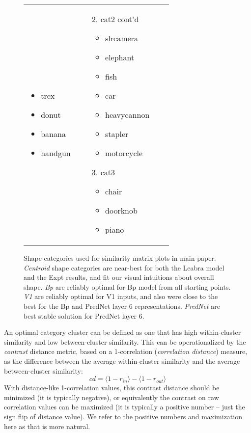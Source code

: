 \documentclass[12pt,twoside]{naturefigs}
\newif\myifpdf
\begin{document}
\begin{figure}
\begin{tabular}{llll}
{\begin{enumerate}
\begin{itemize}[leftmargin=*]
	\item trex
	\item donut
	\item banana
	\item handgun
	\end{itemize}
	\end{enumerate}
	} & 
	 \parbox[t]{1.4in}{\raggedright 	{} \small
	\begin{enumerate}
	\item[2.] cat2 cont'd
	\begin{itemize}[leftmargin=*]
	\item slrcamera
	\item elephant
	\item fish
	\item car
	\item heavycannon
	\item stapler
	\item motorcycle
	\end{itemize}
	\item[3.] cat3
	\begin{itemize}[leftmargin=*]
	\item chair
	\item doorknob
	\item piano
	\end{itemize}
	\end{enumerate}
	}\\
	\end{tabular}
	\caption{Shape categories used for similarity matrix plots in main paper.  {\em Centroid} shape categories are near-best for both the Leabra model and the Expt results, and fit our visual intuitions about overall shape. {\em Bp} are reliably optimal for Bp model from all starting points.  {\em V1} are reliably optimal for V1 inputs, and also were close to the best for the Bp and PredNet layer 6 representations.  {\em PredNet} are best stable solution for PredNet layer 6.}
	\label{fig.cats}
\end{figure}

An optimal category cluster can be defined as one that has high within-cluster similarity and low between-cluster similarity.  This can be operationalized by the {\em contrast} distance metric, based on a 1-correlation ({\em correlation distance}) measure, as the difference between the average within-cluster similarity and the average between-cluster similarity:
\begin{equation}
 cd = \langle 1-r_{in} \rangle - \langle 1-r_{out} \rangle 
\end{equation}
With distance-like 1-correlation values, this contrast distance should be minimized (it is typically negative), or equivalently the contrast on raw correlation values can be maximized (it is typically a positive number -- just the sign flip of distance value).  We refer to the positive numbers and maximization here as that is more natural.
\end{document}
